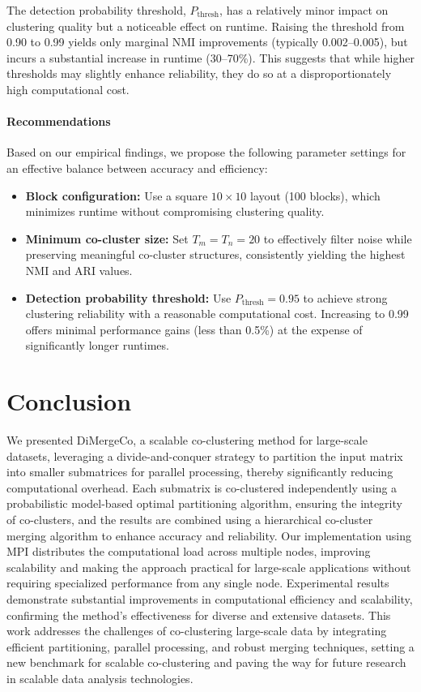 \documentclass[journal]{IEEEtran}
\begin{document}
{        The detection probability threshold, $P_{\text{thresh}}$, has a relatively minor impact on clustering quality but a noticeable effect on runtime. Raising the threshold from 0.90 to 0.99 yields only marginal NMI improvements (typically 0.002--0.005), but incurs a substantial increase in runtime (30--70\%). This suggests that while higher thresholds may slightly enhance reliability, they do so at a disproportionately high computational cost.

        \paragraph{Recommendations}
        Based on our empirical findings, we propose the following parameter settings for an effective balance between accuracy and efficiency:
        \begin{itemize}
            \item \textbf{Block configuration:} Use a square $10 \times 10$ layout (100 blocks), which minimizes runtime without compromising clustering quality.
            \item \textbf{Minimum co-cluster size:} Set $T_m = T_n = 20$ to effectively filter noise while preserving meaningful co-cluster structures, consistently yielding the highest NMI and ARI values.
            \item \textbf{Detection probability threshold:} Use $P_{\text{thresh}} = 0.95$ to achieve strong clustering reliability with a reasonable computational cost. Increasing to 0.99 offers minimal performance gains (less than 0.5\%) at the expense of significantly longer runtimes.
        \end{itemize}
    }

\section{Conclusion}
\label{sec:conclusion}
We presented DiMergeCo, a scalable co-clustering method for large-scale datasets, leveraging a divide-and-conquer strategy to partition the input matrix into smaller submatrices for parallel processing, thereby significantly reducing computational overhead. Each submatrix is co-clustered independently using a probabilistic model-based optimal partitioning algorithm, ensuring the integrity of co-clusters, and the results are combined using a hierarchical co-cluster merging algorithm to enhance accuracy and reliability. Our implementation using MPI distributes the computational load across multiple nodes, improving scalability and making the approach practical for large-scale applications without requiring specialized performance from any single node. Experimental results demonstrate substantial improvements in computational efficiency and scalability, confirming the method's effectiveness for diverse and extensive datasets. This work addresses the challenges of co-clustering large-scale data by integrating efficient partitioning, parallel processing, and robust merging techniques, setting a new benchmark for scalable co-clustering and paving the way for future research in scalable data analysis technologies.

\printbibliography
\end{document}
